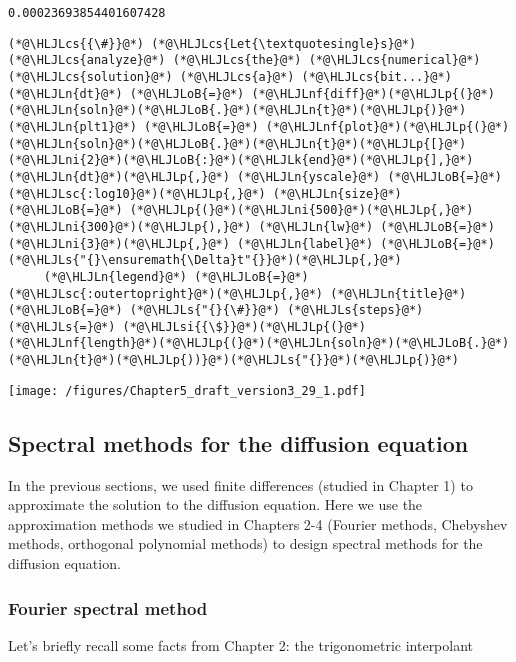 \documentclass[12pt,landscape]{article}
\newcommand{\HLJLk}[1]{\textcolor[RGB]{148,91,176}{\textbf{#1}}}
\newcommand{\HLJLn}[1]{#1}
\newcommand{\HLJLnf}[1]{\textcolor[RGB]{66,102,213}{#1}}
\newcommand{\HLJLs}[1]{\textcolor[RGB]{201,61,57}{#1}}
\newcommand{\HLJLsc}[1]{\textcolor[RGB]{201,61,57}{#1}}
\newcommand{\HLJLsi}[1]{#1}
\newcommand{\HLJLni}[1]{\textcolor[RGB]{59,151,46}{#1}}
\newcommand{\HLJLoB}[1]{\textcolor[RGB]{102,102,102}{\textbf{#1}}}
\newcommand{\HLJLp}[1]{#1}
\newcommand{\HLJLcs}[1]{\textcolor[RGB]{153,153,119}{\textit{#1}}}
\begin{document}
{\begin{lstlisting}
0.00023693854401607428
\end{lstlisting}


\begin{lstlisting}
(*@\HLJLcs{{\#}}@*) (*@\HLJLcs{Let{\textquotesingle}s}@*) (*@\HLJLcs{analyze}@*) (*@\HLJLcs{the}@*) (*@\HLJLcs{numerical}@*) (*@\HLJLcs{solution}@*) (*@\HLJLcs{a}@*) (*@\HLJLcs{bit...}@*)
(*@\HLJLn{dt}@*) (*@\HLJLoB{=}@*) (*@\HLJLnf{diff}@*)(*@\HLJLp{(}@*)(*@\HLJLn{soln}@*)(*@\HLJLoB{.}@*)(*@\HLJLn{t}@*)(*@\HLJLp{)}@*)
(*@\HLJLn{plt1}@*) (*@\HLJLoB{=}@*) (*@\HLJLnf{plot}@*)(*@\HLJLp{(}@*)(*@\HLJLn{soln}@*)(*@\HLJLoB{.}@*)(*@\HLJLn{t}@*)(*@\HLJLp{[}@*)(*@\HLJLni{2}@*)(*@\HLJLoB{:}@*)(*@\HLJLk{end}@*)(*@\HLJLp{],}@*) (*@\HLJLn{dt}@*)(*@\HLJLp{,}@*) (*@\HLJLn{yscale}@*) (*@\HLJLoB{=}@*) (*@\HLJLsc{:log10}@*)(*@\HLJLp{,}@*) (*@\HLJLn{size}@*) (*@\HLJLoB{=}@*) (*@\HLJLp{(}@*)(*@\HLJLni{500}@*)(*@\HLJLp{,}@*) (*@\HLJLni{300}@*)(*@\HLJLp{),}@*) (*@\HLJLn{lw}@*) (*@\HLJLoB{=}@*) (*@\HLJLni{3}@*)(*@\HLJLp{,}@*) (*@\HLJLn{label}@*) (*@\HLJLoB{=}@*) (*@\HLJLs{"{}\ensuremath{\Delta}t"{}}@*)(*@\HLJLp{,}@*) 
     (*@\HLJLn{legend}@*) (*@\HLJLoB{=}@*) (*@\HLJLsc{:outertopright}@*)(*@\HLJLp{,}@*) (*@\HLJLn{title}@*) (*@\HLJLoB{=}@*) (*@\HLJLs{"{}{\#}}@*) (*@\HLJLs{steps}@*) (*@\HLJLs{=}@*) (*@\HLJLsi{{\$}}@*)(*@\HLJLp{(}@*)(*@\HLJLnf{length}@*)(*@\HLJLp{(}@*)(*@\HLJLn{soln}@*)(*@\HLJLoB{.}@*)(*@\HLJLn{t}@*)(*@\HLJLp{))}@*)(*@\HLJLs{"{}}@*)(*@\HLJLp{)}@*)
\end{lstlisting}

\texttt{[image: /figures/Chapter5\_draft\_version3\_29\_1.pdf]}

\subsection{Spectral methods for the diffusion equation}
In the previous sections, we used finite differences (studied in Chapter 1) to approximate the solution to the diffusion equation. Here we use the approximation methods we studied in Chapters 2-4 (Fourier methods, Chebyshev methods, orthogonal polynomial methods) to design spectral methods for the diffusion equation.

\subsubsection{Fourier spectral method}
Let's briefly recall some facts from Chapter 2: the trigonometric interpolant

}
\end{document}
